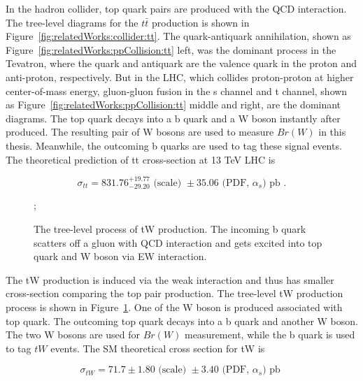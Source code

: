 \noindent In the hadron collider, top quark pairs are produced with the QCD interaction. The tree-level diagrams for the $t\bar{t}$ production is shown in Figure~\ref{fig:relatedWorks:collider:tt}. The quark-antiquark annihilation, shown as Figure~\ref{fig:relatedWorks:ppCollision:tt} left, was the dominant process in the Tevatron, where the quark and antiquark are the valence quark in the proton and anti-proton, respectively. But in the LHC, which collides proton-proton at higher center-of-mass energy, gluon-gluon fusion in the s channel and t channel, shown as  Figure~\ref{fig:relatedWorks:ppCollision:tt} middle and right, are the dominant diagrams. The top quark decays into a b quark and a W boson instantly after produced. The resulting pair of W bosons are used to measure $Br(W)$ in this thesis. Meanwhile, the outcoming b quarks are used to tag these signal events. The theoretical prediction of tt cross-section at 13 TeV LHC is

\begin{equation}
    \sigma_{tt} = 831.76 ^{+19.77}_{-29.20} \text{ (scale) } \pm 35.06 \text{ (PDF, $\alpha_s$) pb } .
\end{equation}



\begin{figure}[ht]
    \centering
    ; \qquad
    \caption{The tree-level process of tW production. The incoming b quark scatters off a gluon with QCD interaction and gets excited into top quark and W boson via EW interaction.}
    \label{fig:relatedWorks:ppCollision:tw}
\end{figure}

\noindent The tW production is induced via the weak interaction and thus has smaller cross-section comparing the top pair production. The tree-level tW production process is shown in Figure~\ref{fig:relatedWorks:ppCollision:tw}. One of the W boson is produced associated with top quark. The outcoming top quark decays into a b quark and another W boson. The two W bosons are used for  $Br(W)$ measurement, while the b quark is used to tag $tW$ events. The SM theoretical cross section for tW is 

\begin{equation}
    \sigma_{tW} = 71.7 \pm 1.80 \text{ (scale) } \pm 3.40  \text{ (PDF, $\alpha_s$) pb }
\end{equation}


